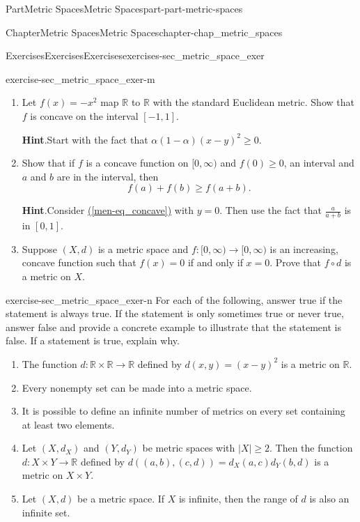\documentclass[oneside,10pt,]{book}
\newcommand{\blocktitlefont}{\relax}
\newcommand{\xreffont}{\relax}
\numberwithin{equation}{chapter}
\newcommand{\R}{\mathbb{R}}
\begin{document}
\begin{partptx}{Part}{Metric Spaces}{}{Metric Spaces}{}{}{part-part-metric-spaces}
\begin{chapterptx}{Chapter}{Metric Spaces}{}{Metric Spaces}{}{}{chapter-chap_metric_spaces}
\begin{exercises-section}{Exercises}{Exercises}{}{Exercises}{}{}{exercises-sec_metric_space_exer}
\begin{divisionexercise}{13}{}{}{exercise-sec_metric_space_exer-m}
\begin{enumerate}[font=\bfseries,label=(\alph*),ref=\alph*]
\item{}Let \(f(x) = -x^2\) map \(\R\) to \(\R\) with the standard Euclidean metric. Show that \(f\) is concave on the interval \([-1,1]\).%
\par\smallskip%
\noindent\textbf{\blocktitlefont Hint}.\hypertarget{hint-sec_metric_space_exer-m-b-b}{}\quad{}Start with the fact that \(\alpha(1-\alpha)(x-y)^2 \geq 0\).%
\item{}Show that if \(f\) is a concave function on \([0,\infty)\) and \(f(0) \geq 0\), an interval and \(a\) and \(b\) are in the interval, then%
\begin{equation*}
f(a) + f(b) \geq f(a+b)\text{.}
\end{equation*}
%
\par\smallskip%
\noindent\textbf{\blocktitlefont Hint}.\hypertarget{hint-sec_metric_space_exer-m-c-b}{}\quad{}Consider \hyperref[men-eq_concave]{({\xreffont\ref{men-eq_concave}})} with \(y=0\). Then use the fact that \(\frac{a}{a+b}\) is in \([0,1]\).%
\item{}Suppose \((X,d)\) is a metric space and \(f: [0, \infty) \to [0, \infty)\) is an increasing, concave function such that \(f(x) = 0\) if and only if \(x=0\). Prove that \(f \circ d\) is a metric on \(X\).%
\end{enumerate}%
\end{divisionexercise}%
\begin{divisionexercise}{14}{}{}{exercise-sec_metric_space_exer-n}%
For each of the following, answer true if the statement is always true. If the statement is only sometimes true or never true, answer false and provide a concrete example to illustrate that the statement is false. If a statement is true, explain why.%
\begin{enumerate}[font=\bfseries,label=(\alph*),ref=\alph*]%
\item{}The function \(d: \R \times \R \to \R\) defined by \(d(x,y) = (x-y)^2\) is a metric on \(\R\).%
\item{}Every nonempty set can be made into a metric space.%
\item{}It is possible to define an infinite number of metrics on every set containing at least two elements.%
\item{}Let \((X, d_X)\) and \((Y, d_Y)\) be metric spaces with \(|X| \geq 2\). Then the function \(d: X \times Y \to \R\) defined by \(d((a,b),(c,d)) = d_X(a,c)d_Y(b,d)\) is a metric on \(X \times Y\).%
\item{}Let \((X,d)\) be a metric space. If \(X\) is infinite, then the range of \(d\) is also an infinite set.%

\end{enumerate}
\end{divisionexercise}
\end{exercises-section}
\end{chapterptx}
\end{partptx}
\end{document}
